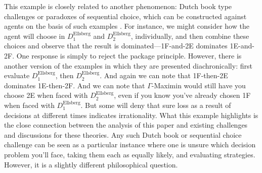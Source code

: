 \documentclass[a4paper,final]{article}
\newenvironment{CCM rewritten}
{\begingroup\color{blue}} %
{\endgroup}              %
\begin{document}
	This example is closely related to another phenomenon: Dutch book type challenges or paradoxes of sequential choice, which can be constructed against agents on the basis of such examples \citep{seidenfeld2004contrast,elga2010sp}. 
	For instance, we might consider how the agent will choose in $D^{\mathrm{Ellsberg}}_1$ and $D^{\mathrm{Ellsberg}}_2$, individually, and then combine these choices and observe that the result is dominated---1F-and-2E dominates 1E-and-2F. One response is simply to reject the package principle. However, there is another version of the examples in which they are presented diachronically: first evaluate $D^{\mathrm{Ellsberg}}_1$, then $D^{\mathrm{Ellsberg}}_2$. And again we can note that 1F-then-2E dominates 1E-then-2F. And we can note that $\Gamma$-Maximin would still have you choose 2E when faced with $D^{\mathrm{Ellsberg}}_2$, even if you know you've already chosen 1F when faced with $D^{\mathrm{Ellsberg}}_1$. But some will deny that sure loss as a result of decisions at different times indicates irrationality.
		What this example highlights is the close connection between the analysis of this paper and existing challenges and discussions for these theories. Any such Dutch book or sequential choice challenge can be seen as a particular instance where one is unsure which decision problem you'll face, taking them each as equally likely, and evaluating strategies. However, it is a slightly different philosophical question.%

\end{document}
